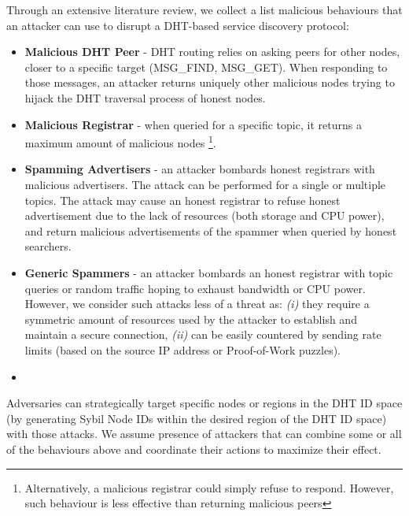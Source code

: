 Through an extensive literature review\cite{chen2020survey, henningsen2019eclipsing}, we collect a list malicious behaviours that an attacker can use to disrupt a DHT-based service discovery protocol:
\begin{itemize}
    \item \textbf{Malicious DHT Peer} - DHT routing relies on asking peers for other nodes, closer to a specific target (\eg MSG\_FIND, MSG\_GET). When responding to those messages, an attacker returns uniquely other malicious nodes trying to hijack the DHT traversal process of honest nodes.
    \item \textbf{Malicious Registrar} - when queried for a specific topic, it returns a maximum amount of malicious nodes \footnote{Alternatively, a malicious registrar could simply refuse to respond. However, such behaviour is less effective than returning malicious peers}. 
    \item \textbf{Spamming Advertisers} - an attacker bombards honest registrars with malicious advertisers. The attack can be performed for a single or multiple topics. The attack may cause an honest registrar to refuse honest advertisement due to the lack of resources (both storage and CPU power), and return malicious advertisements of the spammer when queried by honest searchers. 
    \item \textbf{Generic Spammers} - an attacker bombards an honest registrar with topic queries or random traffic hoping to exhaust bandwidth or CPU power. However, we consider such attacks less of a threat as: \textit{(i)} they require a symmetric amount of resources used by the attacker to establish and maintain a secure connection, \textit{(ii)} can be easily countered by sending rate limits (\eg based on the source IP address or Proof-of-Work puzzles). 
    \item {}
\end{itemize}

Adversaries can strategically target specific nodes or regions in the DHT ID space (\ie by generating Sybil Node IDs within the desired region of the DHT ID space) with those attacks. We assume presence of attackers that can combine some or all of the behaviours above and coordinate their actions to maximize their effect. 


